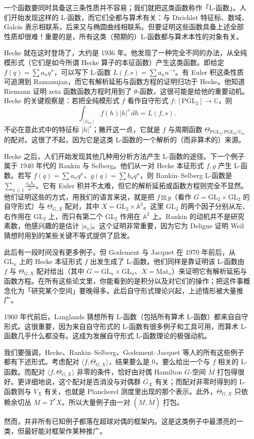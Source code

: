一个函数要同时具备这三条性质并不容易；我们就把这类函数称作「L-函数」。人们开始发现这样的 L-函数，而它们全都与算术有关：与 Dirichlet 特征标、数域、Galois 表示相联系，后来又与椭圆曲线相联系。但要证明这些函数具备上述全部性质却很难！重要的是，所有这类（预期的）L-函数都与算术本性的对象有关。

Hecke 就在这时登场了，大约是 1936 年。他发现了一种完全不同的办法，从全纯模形式（它们是如今所谓 Hecke 算子的本征函数）产生这类函数。即给定 $f(q)=\sum a_nq^n$，可以写下 L-函数 $L(f,s)=\sum a_nn^{-s}$。有 Euler 积这条性质可追溯到 Ramanujan，而它有解析延拓与函数方程的证明归功于 Hecke。他知道 Riemann 证明 zeta 函数函数方程时用到了 $\theta$-函数，这很可能是给他的重要动机。Hecke 的关键观察是：若把全纯模形式 $f$ 看作自守形式 $f:[\mathrm{PGL}_2]\to\mathbb C$，则
\[
  \int_{[\mathbb G_m]}f(h)|h|^s\,dh=L(f,s).
\]
不必在意此式中的特征标 $|h|^s$；撇开这一点，它就是 $f$ 与周期函数 $\Theta_{\mathrm{PGL}_2,\mathrm{PGL}_2/\mathbb G_m}$ 的配对。这很了不起，因为它是这类 L-函数的一个解析的（而非算术的）来源。

Hecke 之后，人们开始发现其他几种用分析方法产生 L-函数的途径。下一个例子属于 1940 年代的 Rankin 与 Selberg。他们从一对 Hecke 本征形式 $f,g$ 产生 L-函数。若写 $f(q)=\sum a_nq^n$、$g(q)=\sum b_nq^n$，则 Rankin–Selberg L-函数是 $\sum_{n\ge1}\frac{a_n\bar b_n}{n^s}$。它有 Euler 积并不太难，但它的解析延拓或函数方程则完全不显然。他们证明这些的方式，用我们的语言来说，就是把 $f\boxtimes g$（看作 $G=\mathrm{GL}_2\times\mathrm{GL}_2$ 的自守形式）与 $\Theta_{G,X}$ 配对，其中 $X=\mathrm{GL}_2\times\mathbb A^2$。这里 $\mathrm{GL}_2$ 的两个因子分别从左、右作用在 $\mathrm{GL}_2$ 上，而只有第二个 $\mathrm{GL}_2$ 作用在 $\mathbb A^2$ 上。Rankin 的动机并不是研究素数，他感兴趣的是估计 $|a_n|$。这个证明非常重要，因为它为 Deligne 证明 Weil 猜想时用到的某些关键不等式提供了启发。

此后有一段时间没有更多例子。但 Godement 与 Jacquet 在 1970 年前后，从 $\mathrm{GL}_n$ 上的 Hecke 本征形式 $f$ 出发生成了 L-函数。他们同样是靠证明该 L-函数由 $f$ 与 $\Theta_{G,X}$ 配对给出（其中 $G=\mathrm{GL}_n\times\mathrm{GL}_n$、$X=\mathrm{Mat}_n$）来证明它有解析延拓与函数方程。在所有这些论文里，你能看到的是积分以及对它们的操作；把这件事概念化为「研究某个空间」要晚得多。此后自守形式理论兴起，上述情形被大量推广。

1960 年代前后，Langlands 猜想所有 L-函数（包括所有算术 L-函数）都来自自守形式。这很重要，因为来自自守形式的 L-函数有很多例子和工具可用，而算术 L-函数几乎什么都没有。这成为发展自守形式 L-函数理论的极强动机。

我们要强调，Hecke、Rankin–Selberg、Godement–Jacquet 等人的所有这些例子都有下述形式。考虑配对 $\langle f,\Theta_{G,X}\rangle$，结果要么是 $0$，要么给出一个与 $f$ 相关的 L-函数。而配对 $\langle f,\Theta_{G,X}\rangle$ 非零的条件，恰好由对偶 Hamilton $\check G$-空间 $\check M$ 打包得很好。更详细地说，这个配对是否消没与对偶群 $\check G_X$ 有关；而配对非零时得到的 L-函数则与 $V_X$ 有关，也就是 Plancherel 测度里出现的那个表示。此外，$\Theta_{G,X}$ 只依赖余切丛 $M=T^*X$。所以大量例子由一对 $(M,\check M)$ 打包。

然而，并非所有已知例子都落在超球对偶的框架内。这是这类例子中最漂亮的一类，但最好能对框架作某种推广。
